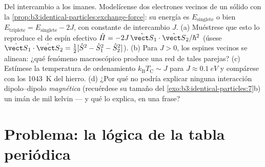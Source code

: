 \begin{exercise}[$\star\star\star$]\label{exo:b3:identical-particles:12}
Del intercambio a los imanes. Modelícense dos electrones vecinos de un
sólido con la \cref{prop:b3:identical-particles:exchange-force}: su
energía es $E_{\text{singlete}}$ o bien $E_{\text{triplete}} =
E_{\text{singlete}} - 2J$, con constante de intercambio $J$. (a) Muéstrese
que esto lo reproduce el  de espín efectivo $\hat H =
-2J\,\hat{\vect S}_1\cdot\hat{\vect S}_2/\hbar^2$ (úsese
$\hat{\vect S}_1\cdot\hat{\vect S}_2 = \tfrac12[\hat S^2 - \hat
S_1^2 - \hat S_2^2]$). (b) Para $J > 0$, los espines vecinos se alinean:
¿qué fenómeno macroscópico produce una red de tales parejas?
(c) Estímese la temperatura de ordenamiento $k_{\text{B}}T_{\text{C}}
\sim J$ para $J \approx \qty{0.1}{eV}$ y compárese con los
\qty{1043}{K} del hierro. (d) ¿Por qué no podría explicar ninguna
interacción dipolo--dipolo \emph{magnética} (recuérdese su tamaño del
\cref{exo:b3:identical-particles:7}b) un imán de mil kelvin --- y qué lo
explica, en una frase?
\end{exercise}

\section{Problema: la lógica de la tabla periódica}

